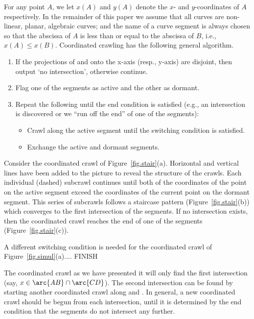 For any point $A$, we let $x(A)$ and $y(A)$ denote the $x$- and
$y$-coordinates of $A$ respectively.
In the remainder of this paper
we assume that all curves are non-linear, planar, algebraic curves;
and the name 
 of a curve segment is always chosen so that the abscissa of
$A$ is less than or equal to the abscissa of $B$, i.e., $x(A) \leq x(B)$.
Coordinated crawling has the following general algorithm.

\begin{enumerate}
\item 
	If the projections of  and  onto the x-axis (resp.,
	y-axis) are disjoint, then output `no intersection', otherwise
	continue.
\item
	Flag one of the segments as active and the other as dormant.
\item
	Repeat the following until the end condition is satisfied
	(e.g., an intersection is discovered or we ``run off the end''
	of one of the segments):
\begin{itemize}
\item
	Crawl along the active segment until the switching condition 
	is satisfied.
\item
	Exchange the active and dormant segments.
\end{itemize}
\end{enumerate}
%
%
\ifFull
\begin{example}
\label{eg1}
Consider the coordinated crawl of Figure~\ref{fig.stair}(a).
Horizontal and vertical lines have been added to the picture 
to reveal the structure of the crawls.
Each individual (dashed) subcrawl continues until both of the coordinates of the
point on the active segment exceed the coordinates of the current point on the 
dormant segment.
This series of subcrawls follows a staircase pattern (Figure~\ref{fig.stair}(b))
which converges to the first intersection of the segments.
If no intersection exists, then the coordinated crawl reaches the end of one 
of the segments (Figure~\ref{fig.stair}(c)).

A different switching condition is needed for the coordinated crawl of 
Figure~\ref{fig.simul}(a).... FINISH
\end{example}
\fi
%

The coordinated crawl as we have presented it will only find the first 
intersection (say, $x \in \arc{AB} \cap \arc{CD}$).
The second intersection can be found by starting another coordinated crawl
along  and .
In general, a new coordinated crawl should be begun from each intersection,
until it is
determined by the end condition that the segments do not intersect any further.

